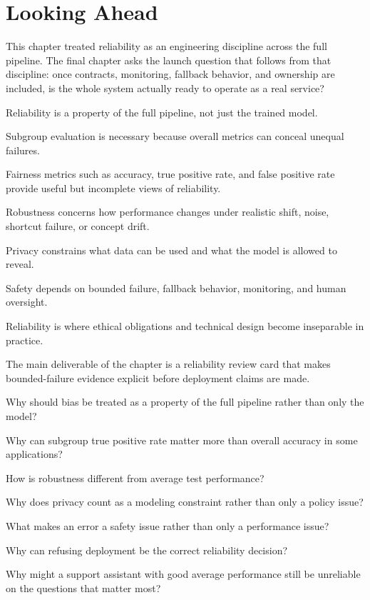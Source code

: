 \section{Looking Ahead}

This chapter treated reliability as an engineering discipline across the full pipeline. The final chapter asks the launch question that follows from that discipline: once contracts, monitoring, fallback behavior, and ownership are included, is the whole system actually ready to operate as a real service?

\begin{chaptersummary}
\item Reliability is a property of the full pipeline, not just the trained model.
\item Subgroup evaluation is necessary because overall metrics can conceal unequal failures.
\item Fairness metrics such as accuracy, true positive rate, and false positive rate provide useful but incomplete views of reliability.
\item Robustness concerns how performance changes under realistic shift, noise, shortcut failure, or concept drift.
\item Privacy constrains what data can be used and what the model is allowed to reveal.
\item Safety depends on bounded failure, fallback behavior, monitoring, and human oversight.
\item Reliability is where ethical obligations and technical design become inseparable in practice.
\item The main deliverable of the chapter is a reliability review card that makes bounded-failure evidence explicit before deployment claims are made.
\end{chaptersummary}

\begin{studyquestions}
\item Why should bias be treated as a property of the full pipeline rather than only the model?
\item Why can subgroup true positive rate matter more than overall accuracy in some applications?
\item How is robustness different from average test performance?
\item Why does privacy count as a modeling constraint rather than only a policy issue?
\item What makes an error a safety issue rather than only a performance issue?
\item Why can refusing deployment be the correct reliability decision?
\item Why might a support assistant with good average performance still be unreliable on the questions that matter most?
\end{studyquestions}


